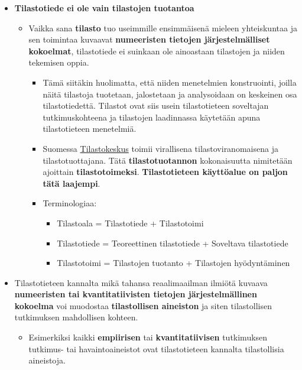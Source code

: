 \documentclass[
]{book}
\providecommand{\tightlist}{%
  \setlength{\itemsep}{0pt}\setlength{\parskip}{0pt}}
\begin{document}
\begin{itemize}
\tightlist
\item
  \textbf{Tilastotiede ei ole vain tilastojen tuotantoa}

  \begin{itemize}
  \tightlist
  \item
    Vaikka sana \textbf{tilasto} tuo useimmille ensimmäisenä mieleen yhteiskuntaa ja sen toimintaa kuvaavat \textbf{numeeristen tietojen järjestelmälliset kokoelmat}, tilastotiede ei suinkaan ole ainoastaan tilastojen ja niiden tekemisen oppia.

    \begin{itemize}
    \tightlist
    \item
      Tämä siitäkin huolimatta, että niiden menetelmien konstruointi, joilla näitä tilastoja tuotetaan, jalostetaan ja analysoidaan on keskeinen osa tilastotiedettä. Tilastot ovat siis usein tilastotieteen soveltajan tutkimuskohteena ja tilastojen laadinnassa käytetään apuna tilastotieteen menetelmiä.
    \item
      Suomessa \href{https://www.stat.fi/}{Tilastokeskus} toimii virallisena tilastoviranomaisena ja tilastotuottajana. Tätä \textbf{tilastotuotannon} kokonaisuutta nimitetään ajoittain \textbf{tilastotoimeksi}. \textbf{Tilastotieteen käyttöalue on paljon tätä laajempi}.
    \item
      Terminologiaa:

      \begin{itemize}
      \tightlist
      \item
        Tilastoala = Tilastotiede + Tilastotoimi\\
      \item
        Tilastotiede = Teoreettinen tilastotiede + Soveltava tilastotiede\\
      \item
        Tilastotoimi = Tilastojen tuotanto + Tilastojen hyödyntäminen
      \end{itemize}
    \end{itemize}
  \end{itemize}
\item
  Tilastotieteen kannalta mikä tahansa reaalimaailman ilmiötä kuvaava \textbf{numeeristen tai kvantitatiivisten tietojen järjestelmällinen kokoelma} voi muodostaa \textbf{tilastollisen aineiston} ja siten tilastollisen tutkimuksen mahdollisen kohteen.

  \begin{itemize}
  \tightlist
  \item
    Esimerkiksi kaikki \textbf{empiirisen} tai \textbf{kvantitatiivisen} tutkimuksen tutkimus- tai havaintoaineistot ovat tilastotieteen kannalta tilastollisia aineistoja.
  \end{itemize}
\end{itemize}
\end{document}

